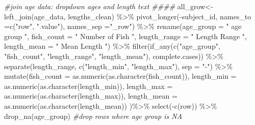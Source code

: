 \documentclass[
]{article}
\newenvironment{Shaded}{\begin{snugshade}}{\end{snugshade}}
\newcommand{\AttributeTok}[1]{\textcolor[rgb]{0.77,0.63,0.00}{#1}}
\newcommand{\CommentTok}[1]{\textcolor[rgb]{0.56,0.35,0.01}{\textit{#1}}}
\newcommand{\FunctionTok}[1]{\textcolor[rgb]{0.00,0.00,0.00}{#1}}
\newcommand{\NormalTok}[1]{#1}
\newcommand{\OtherTok}[1]{\textcolor[rgb]{0.56,0.35,0.01}{#1}}
\newcommand{\SpecialCharTok}[1]{\textcolor[rgb]{0.00,0.00,0.00}{#1}}
\newcommand{\StringTok}[1]{\textcolor[rgb]{0.31,0.60,0.02}{#1}}
\begin{document}
\begin{Shaded}
\begin{Highlighting}[]
\CommentTok{\#join age data: dropdown ages and length text  \#\#\#\#}
\NormalTok{all\_grow}\OtherTok{\textless{}{-}}\FunctionTok{left\_join}\NormalTok{(age\_data, lengths\_clean) }\SpecialCharTok{\%\textgreater{}\%} 
   \FunctionTok{pivot\_longer}\NormalTok{(}\SpecialCharTok{{-}}\NormalTok{subject\_id,}
               \AttributeTok{names\_to =}\FunctionTok{c}\NormalTok{(}\StringTok{"row"}\NormalTok{, }\StringTok{".value"}\NormalTok{),}
                \AttributeTok{names\_sep =}\StringTok{"\_row"}\NormalTok{) }\SpecialCharTok{\%\textgreater{}\%} 
    \FunctionTok{rename}\NormalTok{(}\AttributeTok{age\_group =} \StringTok{" age group "}\NormalTok{, }\AttributeTok{fish\_count =} \StringTok{" Number of Fish "}\NormalTok{, }\AttributeTok{length\_range =} \StringTok{" Length Range "}\NormalTok{, }\AttributeTok{length\_mean =} \StringTok{" Mean Length "}\NormalTok{) }\SpecialCharTok{\%\textgreater{}\%} 
      \FunctionTok{filter}\NormalTok{(}\FunctionTok{if\_any}\NormalTok{(}\FunctionTok{c}\NormalTok{(}\StringTok{"age\_group"}\NormalTok{, }\StringTok{"fish\_count"}\NormalTok{, }\StringTok{"length\_range"}\NormalTok{, }\StringTok{"length\_mean"}\NormalTok{), complete.cases)) }\SpecialCharTok{\%\textgreater{}\%}
  \FunctionTok{separate}\NormalTok{(length\_range, }\FunctionTok{c}\NormalTok{(}\StringTok{"length\_min"}\NormalTok{, }\StringTok{"length\_max"}\NormalTok{), }\AttributeTok{sep =} \StringTok{"{-}"}\NormalTok{) }\SpecialCharTok{\%\textgreater{}\%} 
\FunctionTok{mutate}\NormalTok{(}\AttributeTok{fish\_count =} \FunctionTok{as.numeric}\NormalTok{(}\FunctionTok{as.character}\NormalTok{(fish\_count)), }
      \AttributeTok{length\_min =} \FunctionTok{as.numeric}\NormalTok{(}\FunctionTok{as.character}\NormalTok{(length\_min)), }
      \AttributeTok{length\_max =} \FunctionTok{as.numeric}\NormalTok{(}\FunctionTok{as.character}\NormalTok{(length\_max)),}
      \AttributeTok{length\_mean =} \FunctionTok{as.numeric}\NormalTok{(}\FunctionTok{as.character}\NormalTok{(length\_mean))}
\NormalTok{                                         )}\SpecialCharTok{\%\textgreater{}\%} 
  \FunctionTok{select}\NormalTok{(}\SpecialCharTok{{-}}\FunctionTok{c}\NormalTok{(row)) }\SpecialCharTok{\%\textgreater{}\%} 
  \FunctionTok{drop\_na}\NormalTok{(}\StringTok{\textquotesingle{}age\_group\textquotesingle{}}\NormalTok{) }\CommentTok{\#drop rows where age group is NA }
\end{Highlighting}
\end{Shaded}
\end{document}
